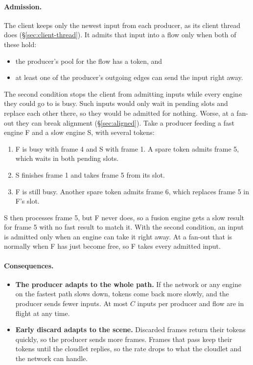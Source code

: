 \documentclass[11pt]{article}
\begin{document}
\paragraph{Admission.} The client keeps only the newest input from each
producer, as its client thread does (\S\ref{sec:client-thread}). It admits that input into a flow
only when both of these hold:
\begin{itemize}[nosep]
  \item the producer's pool for the flow has a token, and
  \item at least one of the producer's outgoing edges can send the input
        right away.
\end{itemize}
The second condition stops the client from admitting inputs while every
engine they could go to is busy. Such inputs would only wait in pending
slots and replace each other there, so they would be admitted for nothing.
Worse, at a fan-out they can break alignment (\S\ref{sec:aligned}). Take a
producer feeding a fast engine F and a slow engine S, with several tokens:
\begin{enumerate}[nosep]
  \item F is busy with frame 4 and S with frame 1. A spare token admits
        frame 5, which waits in both pending slots.
  \item S finishes frame 1 and takes frame 5 from its slot.
  \item F is still busy. Another spare token admits frame 6, which replaces
        frame 5 in F's slot.
\end{enumerate}
S then processes frame 5, but F never does, so a fusion engine gets a slow
result for frame 5 with no fast result to match it. With the second condition,
an input is admitted only when an engine can take it right away. At a fan-out
that is normally when F has just become free, so F takes every admitted
input.

\paragraph{Consequences.}
\begin{itemize}[nosep]
  \item \textbf{The producer adapts to the whole path.} If the network or any
        engine on the fastest path slows down, tokens come back more slowly,
        and the producer sends fewer inputs. At most $C$ inputs per producer
        and flow are in flight at any time.
  \item \textbf{Early discard adapts to the scene.} Discarded frames return
        their tokens quickly, so the producer sends more frames. Frames that
        pass keep their tokens until the cloudlet replies, so the rate drops
        to what the cloudlet and the network can handle.
\end{itemize}
\end{document}
